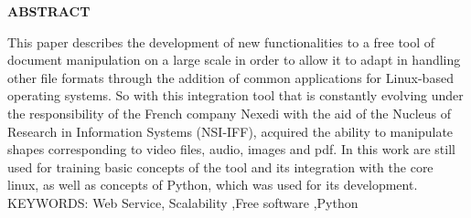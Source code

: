 \begin{center}
\textbf{ABSTRACT}
\end{center}

\singlespacing

\noindent This paper describes the development of new functionalities to a free tool of document manipulation on a large scale in order to allow it to adapt in handling other file formats through the addition of common applications for Linux-based operating systems. So with this integration tool that is constantly evolving under the responsibility of the French company Nexedi with the aid of the Nucleus of Research in Information Systems (NSI-IFF), acquired the ability to manipulate shapes corresponding to video files, audio, images and pdf. In this work are still used for training basic concepts of the tool and its integration with the core linux, as well as concepts of Python, which was used for its development. \\

\noindent KEYWORDS: Web Service, Scalability ,Free software ,Python
